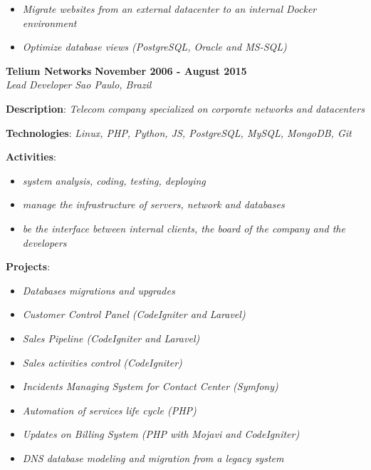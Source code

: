 \documentclass[margin]{res}
\begin{document}
\begin{resume}
\begin{description}
{\begin{itemize}
              \item{\textit{Migrate websites from an external datacenter to an internal Docker environment}}
              \item{\textit{Optimize database views (PostgreSQL, Oracle and MS-SQL)}}
            \end{itemize}
    }
      \end{description}
    \pagebreak
    \textbf{Telium Networks} \hfill \textbf{November 2006 - August 2015}\\
  \textit{Lead Developer} \hfill \textit{Sao Paulo, Brazil}\\
  \begin{description}
    \item{\textbf{Description}: \textit{Telecom company specialized on corporate networks and datacenters}}
    \item{\textbf{Technologies}: \textit{Linux, PHP, Python, JS, PostgreSQL, MySQL, MongoDB, Git}}
    \item{
      \textbf{Activities}:
      \begin{itemize}
              \item{\textit{system analysis, coding, testing, deploying}}
              \item{\textit{manage the infrastructure of servers, network and databases}}
              \item{\textit{be the interface between internal clients, the board of the company and the developers}}
            \end{itemize}
    }
        \item{
      \textbf{Projects}:
      \begin{itemize}
              \item{\textit{Databases migrations and upgrades}}
              \item{\textit{Customer Control Panel (CodeIgniter and Laravel)}}
              \item{\textit{Sales Pipeline (CodeIgniter and Laravel)}}
              \item{\textit{Sales activities control (CodeIgniter)}}
              \item{\textit{Incidents Managing System for Contact Center (Symfony)}}
              \item{\textit{Automation of services life cycle (PHP)}}
              \item{\textit{Updates on Billing System (PHP with Mojavi and CodeIgniter)}}
              \item{\textit{DNS database modeling and migration from a legacy system}}

\end{itemize}}
\end{description}
\end{resume}
\end{document}
